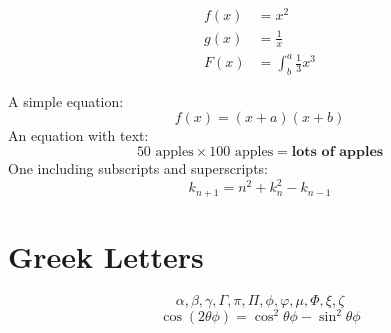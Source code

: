 






\begin{align}
    f(x) &= x^2\\
    g(x) &= \frac{1}{x}\\
    F(x) &= \int^a_b \frac{1}{3}x^3
\end{align}


A simple equation:
\[
 f(x)=(x+a)(x+b)
\]
An equation with text:
\begin{equation}
50 \text{ apples} \times 100 \text{ apples} =
\textbf{lots of apples}
\end{equation}
One including subscripts and superscripts:
\[ k_{n+1} = n^2 + k_n^2 - k_{n-1} \]
\section{Greek Letters}
\[ \alpha,  \beta,  \gamma, \Gamma, \pi, \Pi, \phi, \varphi, \mu, \Phi, \xi, \zeta \]
\[ \cos(2\theta\phi) = \cos^2 \theta\phi - \sin^2 \theta\phi \]
